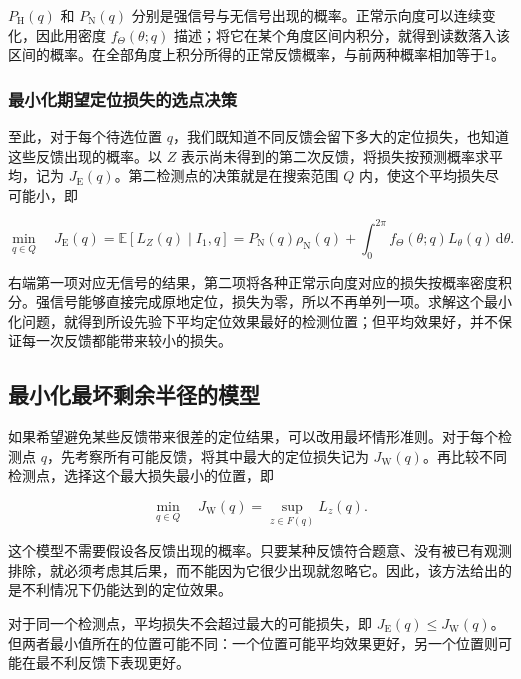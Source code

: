 \(P_{\mathrm H}(q)\) 和 \(P_{\mathrm N}(q)\) 分别是强信号与无信号出现的概率。正常示向度可以连续变化，因此用密度 \(f_\Theta(\theta;q)\) 描述；将它在某个角度区间内积分，就得到读数落入该区间的概率。在全部角度上积分所得的正常反馈概率，与前两种概率相加等于1。

\subsubsection{最小化期望定位损失的选点决策}

至此，对于每个待选位置 \(q\)，我们既知道不同反馈会留下多大的定位损失，也知道这些反馈出现的概率。以 \(Z\) 表示尚未得到的第二次反馈，将损失按预测概率求平均，记为 \(J_{\mathrm E}(q)\)。第二检测点的决策就是在搜索范围 \(Q\) 内，使这个平均损失尽可能小，即

\begin{equation}
 \min_{q\in Q}\quad J_{\mathrm E}(q)=\mathbb E[L_Z(q)\mid I_1,q]
 =P_{\mathrm N}(q)\rho_{\mathrm N}(q)
 +\int_0^{2\pi}f_\Theta(\theta;q)L_\theta(q)\,\mathrm d\theta.
\label{eq:q2-pair-expected-objective}
\end{equation}

右端第一项对应无信号的结果，第二项将各种正常示向度对应的损失按概率密度积分。强信号能够直接完成原地定位，损失为零，所以不再单列一项。求解这个最小化问题，就得到所设先验下平均定位效果最好的检测位置；但平均效果好，并不保证每一次反馈都能带来较小的损失。

\subsection{最小化最坏剩余半径的模型}

如果希望避免某些反馈带来很差的定位结果，可以改用最坏情形准则。对于每个检测点 \(q\)，先考察所有可能反馈，将其中最大的定位损失记为 \(J_{\mathrm W}(q)\)。再比较不同检测点，选择这个最大损失最小的位置，即

\begin{equation}
 \min_{q\in Q}\quad J_{\mathrm W}(q)=\sup_{z\in F(q)}L_z(q).
\label{eq:q2-pair-worst-objective}
\end{equation}

这个模型不需要假设各反馈出现的概率。只要某种反馈符合题意、没有被已有观测排除，就必须考虑其后果，而不能因为它很少出现就忽略它。因此，该方法给出的是不利情况下仍能达到的定位效果。

对于同一个检测点，平均损失不会超过最大的可能损失，即 \(J_{\mathrm E}(q)\le J_{\mathrm W}(q)\)。但两者最小值所在的位置可能不同：一个位置可能平均效果更好，另一个位置则可能在最不利反馈下表现更好。

